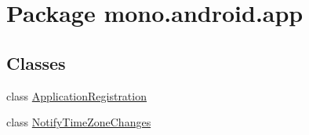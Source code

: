 \hypertarget{namespacemono_1_1android_1_1app}{
\section{Package mono.android.app}
\label{namespacemono_1_1android_1_1app}
}
\subsection*{Classes}
\begin{CompactItemize}
\item 
class \hyperlink{classmono_1_1android_1_1app_1_1_application_registration}{ApplicationRegistration}
\item 
class \hyperlink{classmono_1_1android_1_1app_1_1_notify_time_zone_changes}{NotifyTimeZoneChanges}
\end{CompactItemize}
